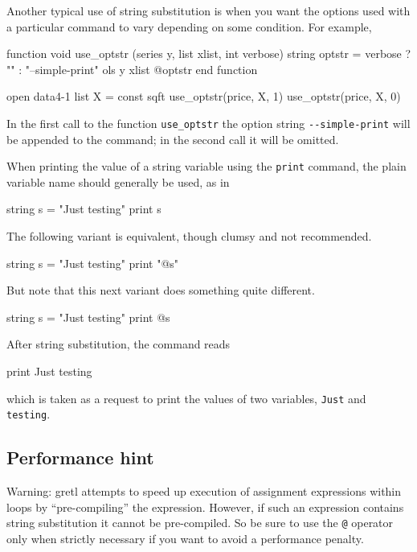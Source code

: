 Another typical use of string substitution is when you want the
options used with a particular command to vary depending on
some condition. For example,
%
\begin{code}
function void use_optstr (series y, list xlist, int verbose)
   string optstr = verbose ? "" : "--simple-print"
   ols y xlist @optstr 
end function

open data4-1
list X = const sqft
use_optstr(price, X, 1)
use_optstr(price, X, 0)
\end{code}

In the first call to the function \texttt{use\_optstr} the option
string \verb|--simple-print| will be appended to the 
command; in the second call it will be omitted.

When printing the value of a string variable using the \texttt{print}
command, the plain variable name should generally be used, as in
%
\begin{code}
string s = "Just testing"
print s
\end{code}
%
The following variant is equivalent, though clumsy and not
recommended.
%
\begin{code}
string s = "Just testing"
print "@s"
\end{code}
%
But note that this next variant does something quite different.
%
\begin{code}
string s = "Just testing"
print @s
\end{code}
%
After string substitution, the command reads
%
\begin{code}
print Just testing
\end{code}
%
which is taken as a request to print the values of two variables,
\texttt{Just} and \texttt{testing}.

\subsection{Performance hint}

Warning: gretl attempts to speed up execution of assignment
expressions within loops by ``pre-compiling'' the expression.
However, if such an expression contains string substitution it cannot
be pre-compiled. So be sure to use the \verb|@| operator only when
strictly necessary if you want to avoid a performance penalty.


\label{LastPage}

